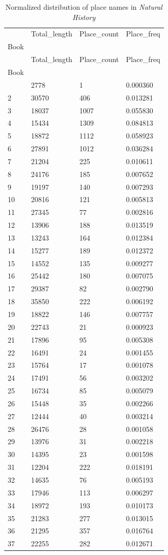 \documentclass[
  12pt,
]{article}
\begin{document}
\hypertarget{tbl-place_book_distribution}{}
\begin{longtable}[]{@{}llll@{}}
\caption{\label{tbl-place_book_distribution}Normalized distribution of
place names in \emph{Natural History}}\tabularnewline
\toprule\noalign{}
& Total\_length & Place\_count & Place\_freq \\
Book & & & \\
\midrule\noalign{}
\endfirsthead
\toprule\noalign{}
& Total\_length & Place\_count & Place\_freq \\
Book & & & \\
\midrule\noalign{}
\endhead
\bottomrule\noalign{}
\endlastfoot
1 & 2778 & 1 & 0.000360 \\
2 & 30570 & 406 & 0.013281 \\
3 & 18037 & 1007 & 0.055830 \\
4 & 15434 & 1309 & 0.084813 \\
5 & 18872 & 1112 & 0.058923 \\
6 & 27891 & 1012 & 0.036284 \\
7 & 21204 & 225 & 0.010611 \\
8 & 24176 & 185 & 0.007652 \\
9 & 19197 & 140 & 0.007293 \\
10 & 20816 & 121 & 0.005813 \\
11 & 27345 & 77 & 0.002816 \\
12 & 13906 & 188 & 0.013519 \\
13 & 13243 & 164 & 0.012384 \\
14 & 15277 & 189 & 0.012372 \\
15 & 14552 & 135 & 0.009277 \\
16 & 25442 & 180 & 0.007075 \\
17 & 29387 & 82 & 0.002790 \\
18 & 35850 & 222 & 0.006192 \\
19 & 18822 & 146 & 0.007757 \\
20 & 22743 & 21 & 0.000923 \\
21 & 17896 & 95 & 0.005308 \\
22 & 16491 & 24 & 0.001455 \\
23 & 15764 & 17 & 0.001078 \\
24 & 17491 & 56 & 0.003202 \\
25 & 16734 & 85 & 0.005079 \\
26 & 15448 & 35 & 0.002266 \\
27 & 12444 & 40 & 0.003214 \\
28 & 26476 & 28 & 0.001058 \\
29 & 13976 & 31 & 0.002218 \\
30 & 14395 & 23 & 0.001598 \\
31 & 12204 & 222 & 0.018191 \\
32 & 14635 & 76 & 0.005193 \\
33 & 17946 & 113 & 0.006297 \\
34 & 18972 & 193 & 0.010173 \\
35 & 21283 & 277 & 0.013015 \\
36 & 21295 & 357 & 0.016764 \\
37 & 22255 & 282 & 0.012671 \\
\end{longtable}
\end{document}
